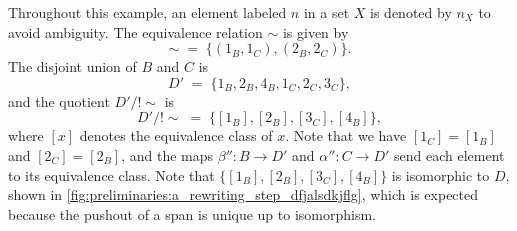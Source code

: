 \begin{example}
\begin{figure}[H]
{
      }
      \caption{}
      \label{fig:preliminaries:a_rewriting_step_dfjalsdkjflg}
  \end{figure}
    Throughout this example, an element labeled \(n\) in a set \(X\) is denoted by \(n_X\) to avoid ambiguity.   
  The equivalence relation \(\sim\) is given by
    \[
    \sim \;=\; \{(1_B,1_C),(2_B,2_C)\}.
    \]
    The disjoint union of \(B\) and \(C\) is
    \[
    D' \;=\; \{1_B,2_B,4_B,1_C,2_C,3_C\},
    \]
    and the quotient \(D'/!\sim\) is
    \[
    D'/!\sim \;=\; \{[1_B],[2_B],[3_C],[4_B]\},
    \]
    where \([x]\) denotes the equivalence class of \(x\). Note that we have \([1_C]=[1_B]\) and \([2_C]=[2_B]\), and the maps
    \(\beta'' \colon B\to D'\) and \(\alpha'' \colon C\to D'\) send each element to its equivalence class. Note that \(\{[1_B],[2_B],[3_C],[4_B]\}\) is isomorphic to \(D\), shown in \autoref{fig:preliminaries:a_rewriting_step_dfjalsdkjflg}, which is expected because the pushout of a span is unique up to isomorphism.
\end{example}


